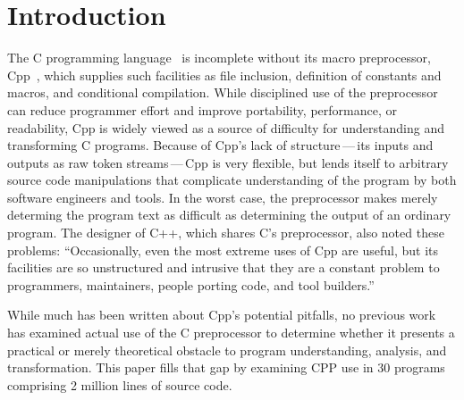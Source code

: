 \documentclass[10pt]{article}
\def\numpackages{30}
\def\numlines{2 million}
\begin{document}
\bigskip

\section{Introduction}

The C programming language~\cite{ansi} is incomplete without its macro
preprocessor, Cpp~\cite[Ch.~3]{Harbison91}, which supplies such facilities
as file inclusion, definition of constants and macros, and conditional
compilation.  While disciplined use of the preprocessor can reduce
programmer effort and improve portability, performance, or readability, Cpp
is widely viewed as a source of difficulty for understanding and
transforming C programs.  Because of Cpp's lack of structure\,---\,its
inputs and outputs as raw token streams\,---\,Cpp is very flexible, but
lends itself to arbitrary source code manipulations that complicate
understanding of the program by both software engineers and tools.  In the
worst case, the preprocessor makes merely determing the program text as
difficult as determining the output of an ordinary program.  The designer
of C++, which shares C's preprocessor, also noted these problems:
``Occasionally, even the most extreme uses of Cpp are useful, but its
facilities are so unstructured and intrusive that they are a constant
problem to programmers, maintainers, people porting code, and tool
builders.''~\cite[p.~424]{Stroustrup-DesignEvolution}

While much has been written about Cpp's potential pitfalls, no previous
work has examined actual use of the C preprocessor to determine whether it
presents a practical or merely theoretical obstacle to program
understanding, analysis, and transformation.  This paper fills that gap by
examining CPP use in {\numpackages} programs comprising {\numlines} lines
of source code.
\end{document}
